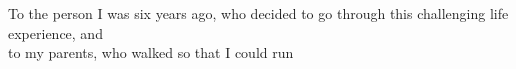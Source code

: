 To the person I was six years ago, who decided to go through this challenging life experience, and\\
to my parents, who walked so that I could run